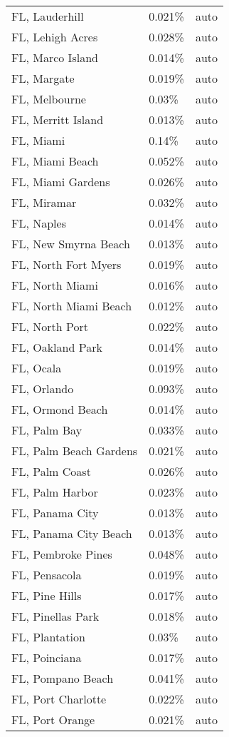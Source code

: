 \begin{longtable}[]{@{}lll@{}}
FL, Lauderhill & 0.021\% & auto \\
FL, Lehigh Acres & 0.028\% & auto \\
FL, Marco Island & 0.014\% & auto \\
FL, Margate & 0.019\% & auto \\
FL, Melbourne & 0.03\% & auto \\
FL, Merritt Island & 0.013\% & auto \\
FL, Miami & 0.14\% & auto \\
FL, Miami Beach & 0.052\% & auto \\
FL, Miami Gardens & 0.026\% & auto \\
FL, Miramar & 0.032\% & auto \\
FL, Naples & 0.014\% & auto \\
FL, New Smyrna Beach & 0.013\% & auto \\
FL, North Fort Myers & 0.019\% & auto \\
FL, North Miami & 0.016\% & auto \\
FL, North Miami Beach & 0.012\% & auto \\
FL, North Port & 0.022\% & auto \\
FL, Oakland Park & 0.014\% & auto \\
FL, Ocala & 0.019\% & auto \\
FL, Orlando & 0.093\% & auto \\
FL, Ormond Beach & 0.014\% & auto \\
FL, Palm Bay & 0.033\% & auto \\
FL, Palm Beach Gardens & 0.021\% & auto \\
FL, Palm Coast & 0.026\% & auto \\
FL, Palm Harbor & 0.023\% & auto \\
FL, Panama City & 0.013\% & auto \\
FL, Panama City Beach & 0.013\% & auto \\
FL, Pembroke Pines & 0.048\% & auto \\
FL, Pensacola & 0.019\% & auto \\
FL, Pine Hills & 0.017\% & auto \\
FL, Pinellas Park & 0.018\% & auto \\
FL, Plantation & 0.03\% & auto \\
FL, Poinciana & 0.017\% & auto \\
FL, Pompano Beach & 0.041\% & auto \\
FL, Port Charlotte & 0.022\% & auto \\
FL, Port Orange & 0.021\% & auto \\

\end{longtable}
